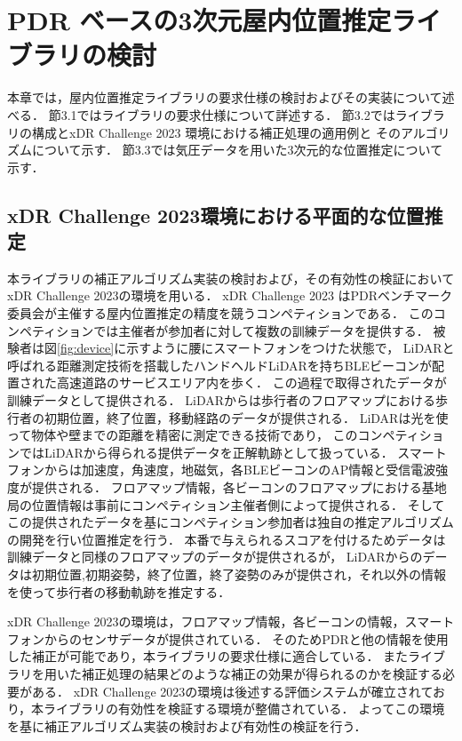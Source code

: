 
\chapter{PDR ベースの3次元屋内位置推定ライブラリの検討}
\thispagestyle{myheadings}
本章では，屋内位置推定ライブラリの要求仕様の検討およびその実装について述べる．
節3.1ではライブラリの要求仕様について詳述する．
節3.2ではライブラリの構成とxDR Challenge 2023 環境における補正処理の適用例と
そのアルゴリズムについて示す．
節3.3では気圧データを用いた3次元的な位置推定について示す．




\section{xDR Challenge 2023環境における平面的な位置推定}

本ライブラリの補正アルゴリズム実装の検討および，その有効性の検証においてxDR Challenge 2023\cite{xdr}の環境を用いる．
xDR Challenge 2023 はPDRベンチマーク委員会が主催する屋内位置推定の精度を競うコンペティションである．
このコンペティションでは主催者が参加者に対して複数の訓練データを提供する．
被験者は図\ref{fig:device}に示すように腰にスマートフォンをつけた状態で，
LiDARと呼ばれる距離測定技術を搭載したハンドヘルドLiDARを持ちBLEビーコンが配置された高速道路のサービスエリア内を歩く．
この過程で取得されたデータが訓練データとして提供される．
LiDARからは歩行者のフロアマップにおける歩行者の初期位置，終了位置，移動経路のデータが提供される．
LiDARは光を使って物体や壁までの距離を精密に測定できる技術であり，
このコンペティションではLiDARから得られる提供データを正解軌跡として扱っている．
スマートフォンからは加速度，角速度，地磁気，各BLEビーコンのAP情報と受信電波強度が提供される．
フロアマップ情報，各ビーコンのフロアマップにおける基地局の位置情報は事前にコンペティション主催者側によって提供される．
そしてこの提供されたデータを基にコンペティション参加者は独自の推定アルゴリズムの開発を行い位置推定を行う．
本番で与えられるスコアを付けるためデータは訓練データと同様のフロアマップのデータが提供されるが，
LiDARからのデータは初期位置,初期姿勢，終了位置，終了姿勢のみが提供され，それ以外の情報を使って歩行者の移動軌跡を推定する．

xDR Challenge 2023の環境は，フロアマップ情報，各ビーコンの情報，スマートフォンからのセンサデータが提供されている．
そのためPDRと他の情報を使用した補正が可能であり，本ライブラリの要求仕様に適合している．
またライブラリを用いた補正処理の結果どのような補正の効果が得られるのかを検証する必要がある．
xDR Challenge 2023の環境は後述する評価システムが確立されており，本ライブラリの有効性を検証する環境が整備されている．
よってこの環境を基に補正アルゴリズム実装の検討および有効性の検証を行う．

